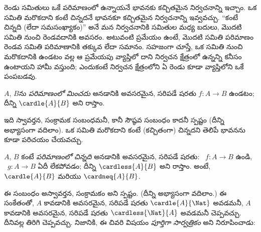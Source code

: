 \documentclass[../../../include/open-logic-section]{subfiles}
\begin{document}


\begin{explain}
రెండు సమితులు ఒకే పరిమాణంలో ఉన్నాయనే భావనకు కచ్చితమైన నిర్వచనాన్ని
ఇచ్చాం. ఒక సమితి మరొకదాని కంటే చిన్నదనే భావనకూ కచ్చితమైన నిర్వచనాన్ని
ఇవ్వవచ్చు. ``కంటే చిన్నది (లేదా సమసంఖ్యాకం)'' అనే మన నిర్వచనానికి
సమితుల మధ్య  బదులు, మొదటి సమితి నుంచి రెండవదానికి
 అవసరం. అటువంటి ప్రమేయం ఉంటే, మొదటి సమితి పరిమాణం
రెండవ సమితి పరిమాణానికి తక్కువ లేదా సమానం. సహజంగా చూస్తే, ఒక సమితి
నుంచి మరొకదానికి  ఉండటం వల్ల ఆ ప్రమేయపు వ్యాప్తిలో దాని
నిర్వచన క్షేత్రంలో ఉన్నన్ని  కనీసం ఉంటాయని హామీ వస్తుంది; ఎందుకంటే
నిర్వచన క్షేత్రంలోని ఏ రెండు  కూడా వ్యాప్తిలోని ఒకే 
పంపబడవు.
\end{explain}

\begin{defn}
$A$, $B$ను \emph{పరిమాణంలో మించదు} అనడానికి అవసరమైన, సరిపడే షరతు
 $f \colon A \to B$ ఉండటం; దీన్ని $\cardle{A}{B}$ అని రాస్తాం.
\end{defn}

ఇది స్వావర్తన, సంక్రామక సంబంధమనీ, కానీ సౌష్ఠవ సంబంధం కాదనీ స్పష్టం
(దీన్ని అభ్యాసంగా వదిలాం). ఒక సమితి మరొకదాని కంటే (కచ్చితంగా)
చిన్నదని తెలిపే భావనను కూడా పరిచయం చేయవచ్చు.

\begin{defn}
$A$, $B$ కంటే \emph{పరిమాణంలో చిన్నది} అనడానికి అవసరమైన, సరిపడే షరతు:
~$f\colon A \to B$ ఉండి, ~$g\colon A
\to B$ ఏదీ లేకపోవడం;
దీన్ని $\cardless{A}{B}$ అని రాస్తాం. అంటే, $\cardle{A}{B}$ మరియు
$\cardneq{A}{B}$.
\end{defn}

ఈ సంబంధం అస్వావర్తన, సంక్రామకం అని స్పష్టం. (దీన్ని అభ్యాసంగా
వదిలాం.) ఈ సంకేతంతో, $A$  కావడానికి అవసరమైన,
సరిపడే షరతు $\cardle{A}{\Nat}$ అవడమనీ, $A$ 
కావడానికి అవసరమైన, సరిపడే షరతు $\cardless{\Nat}{A}$ అవడమనీ
చెప్పవచ్చు. దీనివల్ల
 తిరిగి చెప్పవచ్చు.
నిజానికి, ఈ చివరి విషయం \emph{పూర్తిగా సార్వత్రికం} అని
\citet{Cantor1892} నిరూపించాడు:
\end{document}
